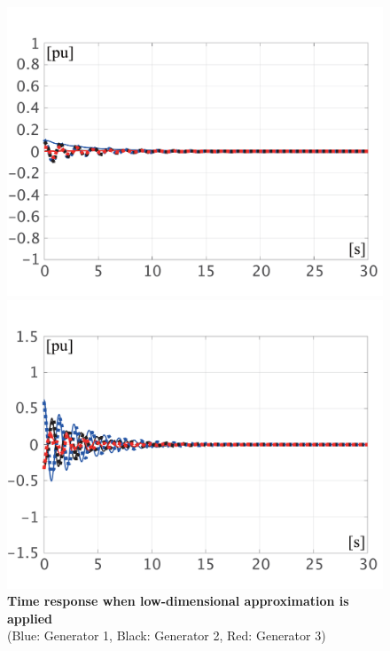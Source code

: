 \documentclass[graybox, envcountchap]{svmult}
\begin{document}
\begin{figure}[t]
{ \begin{minipage}{0.49\linewidth}
    \centering
    \includegraphics[width = 1.0\linewidth]{figs/Espa}
    \medskip
  \end{minipage}
  \begin{minipage}{0.49\linewidth}
    \centering
    \includegraphics[width = 1.0\linewidth]{figs/Pspa}
    \medskip
  \end{minipage}
  }
  \medskip
  \caption{\textbf{Time response when low-dimensional approximation is applied}
  \\  \centering(Blue: Generator 1, Black: Generator 2, Red: Generator 3)}
  \label{fig:timeexsp}
\medskip
\end{figure}
\end{document}
